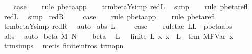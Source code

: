 \begin{isabellebody}
\ \ \isamarkupfalse%
\ {\isacharquery}case\isanewline
\ \ \isamarkupfalse%
\ {\isacharparenleft}rule\ pbeta{\isachardot}app{\isacharparenright}\isanewline
\ \ \isamarkupfalse%
\ trm{\isacharunderscore}beta{\isacharunderscore}Y{\isacharunderscore}simp{}\ red{\isacharunderscore}L\ \isamarkupfalse%
\ simp\isanewline
\ \ \isamarkupfalse%
\ {\isacharparenleft}rule\ pbeta{\isacharunderscore}refl{\isacharparenright}\isanewline
\ \ \isamarkupfalse%
\ red{\isacharunderscore}L\ \isamarkupfalse%
\ simp\isanewline
{}\isamarkupfalse%
\isanewline
{}\isamarkupfalse%
\ red{\isacharunderscore}R\ \isanewline
\ \ \isamarkupfalse%
\ {\isacharquery}case\isanewline
\ \ \isamarkupfalse%
\ {\isacharparenleft}rule\ pbeta{\isachardot}app{\isacharparenright}\isanewline
\ \ \isamarkupfalse%
\ {\isacharparenleft}rule\ pbeta{\isacharunderscore}refl{\isacharparenright}\isanewline
\ \ \isamarkupfalse%
\ trm{\isacharunderscore}beta{\isacharunderscore}Y{\isacharunderscore}simp{}\ red{\isacharunderscore}R\ \isamarkupfalse%
\ auto\isanewline
{}\isamarkupfalse%
\isanewline
{}\isamarkupfalse%
\ {\isacharparenleft}abs\ L{\isacharparenright}\ \isanewline
\ \ \isamarkupfalse%
\ {\isacharquery}case\isanewline
\ \ \isamarkupfalse%
\ {\isacharparenleft}rule{\isacharunderscore}tac\ L{\isacharequal}L\ \ pbeta{\isachardot}abs{\isacharparenright}\isanewline
\ \ \isamarkupfalse%
\ abs\ \isamarkupfalse%
\ auto\isanewline
{}\isamarkupfalse%
\isanewline
{}\isamarkupfalse%
\ {\isacharparenleft}beta\ M\ N{\isacharparenright}\isanewline
\ \ \isamarkupfalse%
\ beta{\isacharparenleft}{}{\isacharparenright}\ \isamarkupfalse%
\ L\ \ {}{\isacharcolon}\ {\isachardoublequoteopen}finite\ L{\isachardoublequoteclose}\ {\isachardoublequoteopen}{\isasymforall}x{\isachardot}\ x\ {\isasymnotin}\ L\ {\isasymlongrightarrow}\ trm\ {\isacharparenleft}M{\isacharcircum}FVar\ x{\isacharparenright}{\isachardoublequoteclose}\ \isamarkupfalse%
\ trm{\isachardot}simps\ \isamarkupfalse%
\ {\isacharparenleft}metis\ finite{\isachardot}intros{\isacharparenleft}{}{\isacharparenright}\ trm{\isacharunderscore}opn{\isacharparenright}\isanewline

\end{isabellebody}
